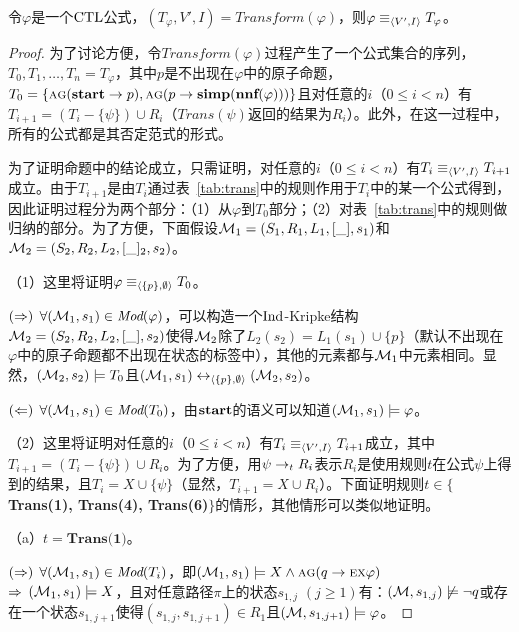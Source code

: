 \begin{proposition}\label{pro:TranE}
	令$\varphi$是一个$\textrm{CTL}$公式，$(T_{\varphi}, V', I) = Transform(\varphi)$，则$\varphi \equiv_{{\langle{V',I}\rangle}} T_{\varphi}$。
\end{proposition}
\begin{proof}
	为了讨论方便，令$Transform(\varphi)$过程产生了一个公式集合的序列，$T_0, T_1, \dots, T_n=T_{\varphi}$，其中$p$是不出现在$\varphi$中的原子命题，$T_0=\{\textsc{a} \textsc{g}(\textbf{start} \rightarrow p), \textsc{a} \textsc{g}(p \rightarrow \textbf{simp}(\textbf{nnf}(\varphi)))\}$且对任意的$i$（$0\leq i < n$）有$T_{i+1} = (T_i-\{\psi\}) \cup R_i$（$Trans(\psi)$返回的结果为$R_i$）。此外，在这一过程中，所有的公式都是其否定范式的形式。
	
	为了证明命题中的结论成立，只需证明，对任意的$i$（$0\leq i < n$）有$T_i \equiv_{{\langle{V',I}\rangle}} T_{i+1}$成立。由于$T_{i+1}$是由$T_i$通过表~\ref{tab:trans}中的规则作用于$T_i$中的某一个公式得到，因此证明过程分为两个部分：（1）从$\varphi$到$T_0$部分；（2）对表~\ref{tab:trans}中的规则做归纳的部分。为了方便，下面假设${\cal M}_1=(S_1,R_1,L_1,[\_],s_1)$和${\cal M}_2=(S_2,R_2,L_2, [\_]_2, s_2)$。
	
	（1）这里将证明$\varphi \equiv_{{\langle{\{p\},\emptyset}\rangle}} T_0$。
	
	$(\Rightarrow)$ $\forall ({\cal M}_1, s_1) \in \textit{Mod}(\varphi)$，可以构造一个$\textrm{Ind}$-Kripke结构${\cal M}_2=(S_2,R_2,L_2,[\_],s_2)$使得${\cal M}_2$除了$L_2(s_2)=L_1(s_1) \cup \{p\}$（默认不出现在$\varphi$中的原子命题都不出现在状态的标签中），其他的元素都与${\cal M}_1$中元素相同。显然，$({\cal M}_2,s_2)\models T_0$且$({\cal M}_1,s_1) \leftrightarrow_{{\langle{\{p\}, \emptyset}\rangle}} ({\cal M}_2, s_2)$。
	
	$(\Leftarrow)$ $\forall ({\cal M}_1,s_1) \in \textit{Mod}(T_0)$，由$\textbf{start}$的语义可以知道$({\cal M}_1,s_1) \models \varphi$。
	
	（2）这里将证明对任意的$i$（$0\leq i < n$）有$T_i \equiv_{{\langle{V',I}\rangle}} T_{i+1}$成立，其中$T_{i+1} = (T_i-\{\psi\}) \cup R_i$。为了方便，用$\psi \rightarrow_t R_i$表示$R_i$是使用规则$t$在公式$\psi$上得到的结果，且$T_i=X\cup \{\psi\}$（显然，$T_{i+1}=X\cup R_i$）。下面证明规则$t\in \{$\textbf{Trans(1), Trans(4), Trans(6)}$\}$的情形，其他情形可以类似地证明。
	
	（a）$t=\textbf{Trans(1)}$。
	
	$(\Rightarrow)$ $\forall ({\cal M}_1,s_1)\in \textit{Mod}(T_i)$，即$({\cal M}_1, s_1) \models X \wedge \textsc{a}\textsc{g}(q \rightarrow \textsc{e} \textsc{x} \varphi)$\\
	$\Rightarrow$ $({\cal M}_1,s_1) \models X$，且对任意路径$\pi$上的状态$s_{1,j}$ $(j\geq 1)$有：$({\cal M},s_{1,j}) \not \models \neg q$或存在一个状态$s_{1,j+1}$使得$(s_{1,j},s_{1,j+1})
	 \in R_1$且$({\cal M},s_{1,j+1}) \models \varphi$。
	

\end{proof}

